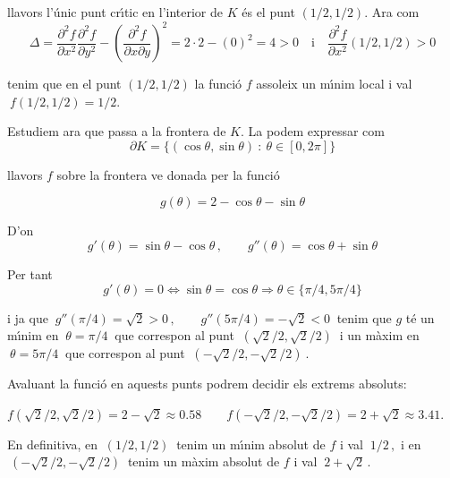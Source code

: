 \documentclass[12pt]{article}
\begin{document}
llavors l'{\'u}nic punt cr{\'\i}tic en l'interior de $ K $ {\'e}s el punt
$ (1/2,1/2) $. Ara com
\[
\Delta = \frac{\partial ^ 2 f}{\partial x ^ 2} \frac{\partial ^ 2
f}{\partial y ^ 2} - \left (\frac{\partial ^ 2 f}{\partial x \partial y}
\right) ^ 2 = 2\cdot 2 - (0) ^ 2 = 4 >0\quad\mbox{i} \quad \frac{\partial ^ 2 f}{\partial x ^ 2}(1/2,1/2)>0
\]

tenim que en el punt $ (1/2,1/2) $ la funci{\'o} $ f $ assoleix un m{\'\i}nim local i val $\ f(1/2,1/2)=1/2 $.

Estudiem ara que passa a la frontera de $K$. La podem expressar com
$$\ \partial K=\{(\cos \theta,\sin\theta)\ :\ \theta\in[0,2\pi]\}\ $$

llavors $f$ sobre la frontera ve donada per la funci{\'o}

$$
g(\theta)=2-\cos \theta-\sin\theta
$$

D'on
$$
g'(\theta)=\sin \theta-\cos\theta\,,\qquad g''(\theta)=\cos \theta+\sin\theta
$$

Per tant
$$
g'(\theta)=0\Leftrightarrow \sin \theta=\cos\theta\Rightarrow \theta\in\{\pi/4 ,5\pi/4 \}
$$

 i ja que $\ g''(\pi/4)=\sqrt{2}>0\,,\qquad g''(5\pi/4)=-\sqrt{2}<0\ $ tenim que $g$ t{\'e} un m{\'\i}nim en $\ \theta=\pi/4\ $ que correspon al punt $\ (\sqrt{2}/2,\sqrt{2}/2)\ $ i un m{\`a}xim en $\ \theta=5\pi/4\ $ que correspon al punt $\ (-\sqrt{2}/2,-\sqrt{2}/2)\ $.

 Avaluant la funci{\'o} en aquests punts podrem decidir els extrems absoluts:

 $f(\sqrt{2}/2,\sqrt{2}/2)=2-\sqrt{2}\approx 0.58\qquad f(-\sqrt{2}/2,-\sqrt{2}/2)=2+\sqrt{2}\approx 3.41$.

 En definitiva, en $\ (1/2,1/2)\ $ tenim un m{\'\i}nim absolut de $f$ i val $\ 1/2\,,$ i en $\ (-\sqrt{2}/2,-\sqrt{2}/2)\ $ tenim un m{\`a}xim absolut de $f$ i val $\ 2+\sqrt{2}\,.$
\end{document}

